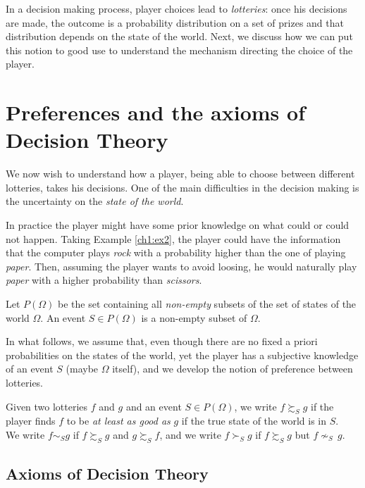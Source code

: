In a decision making process, player choices lead to  \emph{lotteries}: once his decisions are made, the outcome is a probability distribution on a set of prizes and that distribution depends on the state of the world.
Next, we discuss how we can put this notion to good use to understand the mechanism directing the choice of the player.

\section{Preferences and the axioms of Decision Theory}

We now wish to understand how a player, being able to choose between different lotteries, takes his decisions. One of the main difficulties in the decision making is the uncertainty on the \emph{state of the world}.

In practice the player might have some prior knowledge on what could or could not happen. Taking Example \ref{ch1:ex2}, the player could have the information that the computer plays \emph{rock} with a probability higher than the one of playing \emph{paper}. Then, assuming the player wants to avoid loosing, he would naturally play \emph{paper} with a higher probability than  \emph{scissors}.

\begin{definition}
Let $P(\Omega)$ be the set containing all \emph{non-empty} subsets of the set of states of the world $\Omega$.
An event $S \in P(\Omega)$ is a non-empty subset of $ \Omega $.
\end{definition}

In what follows, we assume that, even though there are no fixed a priori probabilities on the states of the world, yet the player has a subjective knowledge of an event $S$ (maybe $\Omega$ itself), and we develop the notion of preference between lotteries.

\begin{notation}[ $\succsim, \, \sim, \, \succ$]
Given two lotteries $f$ and $g$ and an event $S \in P(\Omega)$,
we write $f \succsim_S g$ if the player finds $f$ to be \emph{at least as good as} $g$ if the true state of the world is in $S$. \\
We write $ f \sim_S g $ if $ f \succsim_S g$ and $g \succsim_S f$, and we write  $f \succ_S g$ if $f \succsim_S g$ but $f  {\nsim}_S \, g$.
\end{notation}


\subsection{Axioms of Decision Theory}

